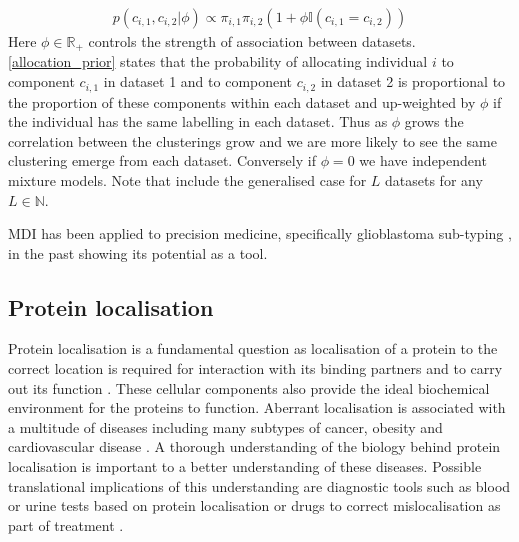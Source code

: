 \documentclass[11pt]{article} %
\begin{document}
\begin{align} \label{allocation_prior}
p(c_{i,1}, c_{i,2} | \phi ) \propto \pi_{i,1} \pi_{i,2} (1 + \phi \mathbb{I}(c_{i,1} = c_{i,2}))
\end{align}
Here $\phi \in \mathbb{R}_+$ controls the strength of association between datasets. \eqref{allocation_prior} states that the probability of allocating individual $i$ to component $c_{i,1}$ in dataset 1 and to component $c_{i,2}$ in dataset 2 is proportional to the proportion of these components within each dataset and up-weighted by $\phi$ if the individual has the same labelling in each dataset. Thus as $\phi$ grows the correlation between the clusterings grow and we are more likely to see the same clustering emerge from each dataset. Conversely if $\phi = 0$ we have independent mixture models. Note that \citet{kirkBayesianCorrelatedClustering2012} include the generalised case for $L$ datasets for any $L \in \mathbb{N}$.

MDI has been applied to precision medicine, specifically glioblastoma sub-typing \cite{SavageIdentifyingcancersubtypes2013a}, in the past showing its potential as a tool.

\subsection{Protein localisation}
Protein localisation is a fundamental question as localisation of a protein to the correct location is required for interaction with its binding partners and to carry out its function \cite{GibsonCellregulationdetermined2009}. These cellular components also provide the ideal biochemical environment for the proteins to function. Aberrant localisation is associated with a multitude of diseases including many subtypes of cancer, obesity and cardiovascular disease \cite{SiljeeSubcellularlocalizationMC4R2018a}\cite{HungProteinlocalizationdisease2011a}\cite{KauNucleartransportcancer2004a}. A thorough understanding of the biology behind protein localisation is important to a better understanding of these diseases. Possible translational implications of this understanding are diagnostic tools such as blood or urine tests based on protein localisation or drugs to correct mislocalisation as part of treatment \cite{KauNucleartransportcancer2004a}\cite{HorganOmictechnologiesgenomics2011a}.
\end{document}
